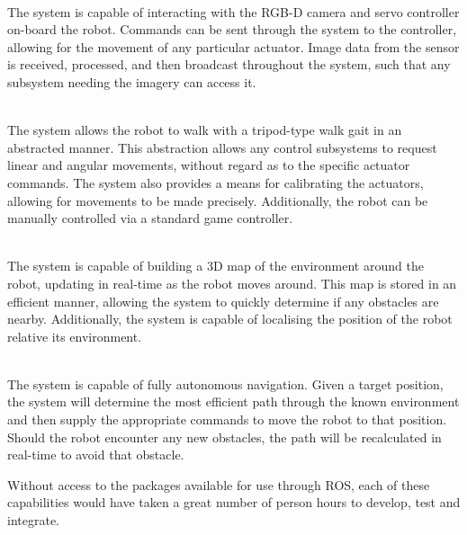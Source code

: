 \begin{description}[labelindent=\parindent]
	\item[Hardware Operations] \hfill \\
	The system is capable of interacting with the RGB-D camera and servo controller on-board the robot. Commands can be sent through the system to the controller, allowing for the movement of any particular actuator. Image data from the sensor is received, processed, and then broadcast throughout the system, such that any subsystem needing the imagery can access it.

	\item[Locomotion] \hfill \\
	The system allows the robot to walk with a tripod-type walk gait in an abstracted manner. This abstraction allows any control subsystems to request linear and angular movements, without regard as to the specific actuator commands. The system also provides a means for calibrating the actuators, allowing for movements to be made precisely. Additionally, the robot can be manually controlled via a standard game controller.

	\item[Sensing] \hfill \\
	The system is capable of building a 3D map of the environment around the robot, updating in real-time as the robot moves around. This map is stored in an efficient manner, allowing the system to quickly determine if any obstacles are nearby. Additionally, the system is capable of localising the position of the robot relative its environment.

	\item[Navigation] \hfill \\
	The system is capable of fully autonomous navigation. Given a target position, the system will determine the most efficient path through the known environment and then supply the appropriate commands to move the robot to that position. Should the robot encounter any new obstacles, the path will be recalculated in real-time to avoid that obstacle.

\end{description}

Without access to the packages available for use through ROS, each of these capabilities would have taken a great number of person hours to develop, test and integrate. 


